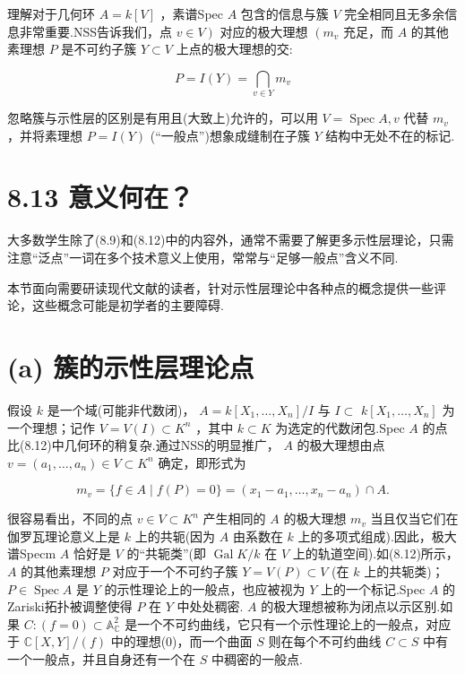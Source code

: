 理解对于几何环 \(A = k\left\lbrack  V\right\rbrack\) ，素谱Spec \(A\) 包含的信息与簇 \(V\) 完全相同且无多余信息非常重要.NSS告诉我们，点 \(\left. {v \in  V}\right)\) 对应的极大理想 \(\left( {m}_{v}\right.\) 充足，而 \(A\) 的其他素理想 \(P\) 是不可约子簇 \(Y \subset  V\) 上点的极大理想的交:

\[
P = I\left( Y\right)  = \mathop{\bigcap }\limits_{{v \in  Y}}{m}_{v}
\]

忽略簇与示性层的区别是有用且(大致上)允许的，可以用 \(V = \operatorname{Spec}A,v\) 代替 \({m}_{v}\) ，并将素理想 \(P = I\left( Y\right)\) (“一般点”)想象成缝制在子簇 \(Y\) 结构中无处不在的标记.

\section{8.13 意义何在？}

大多数学生除了(8.9)和(8.12)中的内容外，通常不需要了解更多示性层理论，只需注意“泛点”一词在多个技术意义上使用，常常与“足够一般点”含义不同.

本节面向需要研读现代文献的读者，针对示性层理论中各种点的概念提供一些评论，这些概念可能是初学者的主要障碍.

\section{(a) 簇的示性层理论点}

假设 \(k\) 是一个域(可能非代数闭)， \(A = k\left\lbrack  {{X}_{1},\ldots ,{X}_{n}}\right\rbrack  /I\) 与 \(I \subset\)  \(k\left\lbrack  {{X}_{1},\ldots ,{X}_{n}}\right\rbrack\) 为一个理想；记作 \(V = V\left( I\right)  \subset  {K}^{n}\) ，其中 \(k \subset  K\) 为选定的代数闭包.Spec \(A\) 的点比(8.12)中几何环的稍复杂.通过NSS的明显推广， \(A\) 的极大理想由点 \(v = \left( {{a}_{1},\ldots ,{a}_{n}}\right)  \in  V \subset  {K}^{n}\) 确定，即形式为

\[
{m}_{v} = \{ f \in  A \mid  f\left( P\right)  = 0\}  = \left( {{x}_{1} - {a}_{1},\ldots ,{x}_{n} - {a}_{n}}\right)  \cap  A.
\]

很容易看出，不同的点 \(v \in  V \subset  {K}^{n}\) 产生相同的 \(A\) 的极大理想 \({m}_{v}\) 当且仅当它们在伽罗瓦理论意义上是 \(k\) 上的共轭(因为 \(A\) 由系数在 \(k\) 上的多项式组成).因此，极大谱Specm \(A\) 恰好是 \(V\) 的“共轭类”(即 \(\operatorname{Gal}K/k\) 在 \(V\) 上的轨道空间).如(8.12)所示， \(A\) 的其他素理想 \(P\) 对应于一个不可约子簇 \(Y = V\left( P\right)  \subset  V\) (在 \(k\) 上的共轭类)； \(P \in  \operatorname{Spec}A\) 是 \(Y\) 的示性理论上的一般点，也应被视为 \(Y\) 上的一个标记.Spec \(A\) 的Zariski拓扑被调整使得 \(P\) 在 \(Y\) 中处处稠密. \(A\) 的极大理想被称为闭点以示区别.如果 \(C : \left( {f = 0}\right)  \subset  {\mathbb{A}}_{\mathbb{C}}^{2}\) 是一个不可约曲线，它只有一个示性理论上的一般点，对应于 \(\mathbb{C}\left\lbrack  {X,Y}\right\rbrack  /\left( f\right)\) 中的理想(0)，而一个曲面 \(S\) 则在每个不可约曲线 \(C \subset  S\) 中有一个一般点，并且自身还有一个在 \(S\) 中稠密的一般点.

